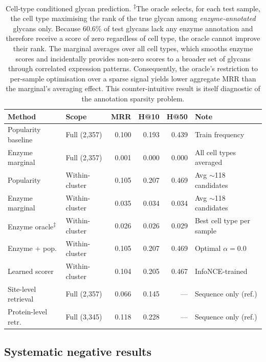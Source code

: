 \documentclass[11pt,a4paper]{article}
\begin{document}
\begin{table}[ht]
\centering
\caption{Cell-type conditioned glycan prediction.
\textsuperscript{$\ddagger$}The oracle selects, for each test sample, the cell type maximising the rank of the true glycan among \emph{enzyme-annotated} glycans only.  Because 60.6\% of test glycans lack any enzyme annotation and therefore receive a score of zero regardless of cell type, the oracle cannot improve their rank.  The marginal averages over all cell types, which smooths enzyme scores and incidentally provides non-zero scores to a broader set of glycans through correlated expression patterns. Consequently, the oracle's restriction to per-sample optimisation over a sparse signal yields lower aggregate MRR than the marginal's averaging effect.  This counter-intuitive result is itself diagnostic of the annotation sparsity problem.}
\label{tab:celltype}
\small
\begin{tabular}{llrrrp{3.5cm}}
\toprule
\textbf{Method} & \textbf{Scope} & \textbf{MRR} & \textbf{H@10} & \textbf{H@50} & \textbf{Note} \\
\midrule
Popularity baseline & Full (2,357) & 0.100 & 0.193 & 0.439 & Train frequency \\
Enzyme marginal & Full (2,357) & 0.001 & 0.000 & 0.000 & All cell types averaged \\
\midrule
Popularity & Within-cluster & 0.105 & 0.207 & 0.469 & Avg $\sim$118 candidates \\
Enzyme marginal & Within-cluster & 0.035 & 0.034 & 0.034 & Avg $\sim$118 candidates \\
Enzyme oracle\textsuperscript{$\ddagger$} & Within-cluster & 0.026 & 0.026 & 0.029 & Best cell type per sample \\
Enzyme + pop. & Within-cluster & 0.105 & 0.207 & 0.469 & Optimal $\alpha = 0.0$ \\
Learned scorer & Within-cluster & 0.104 & 0.205 & 0.467 & InfoNCE-trained \\
\midrule
Site-level retrieval & Full (2,357) & 0.066 & 0.145 & --- & Sequence only (ref.) \\
Protein-level retr. & Full (3,345) & 0.118 & 0.228 & --- & Sequence only (ref.) \\
\bottomrule
\end{tabular}
\end{table}

\subsection{Systematic negative results}
\end{document}
